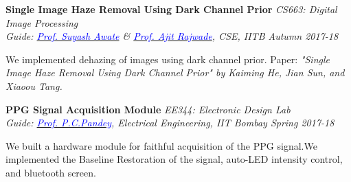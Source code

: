 \documentclass[margin,line, 9pt]{res}
\newenvironment{list1}{
  \begin{list}{\ding{113}}{%
      \setlength{\itemsep}{0in}
      \setlength{\parsep}{0in} \setlength{\parskip}{0in}
      \setlength{\topsep}{0in} \setlength{\partopsep}{0in} 
      \setlength{\leftmargin}{0.17in}}}{\end{list}}
\begin{document}
\begin{resume}
\begin{list1}
\end{list1}




{\bf Single Image Haze Removal Using Dark Channel Prior} \hfill \textit{CS663: Digital Image Processing} \\
{\em Guide: \href{https://www.cse.iitb.ac.in/~suyash}{\textcolor{blue}{Prof. Suyash Awate}} \& \href{https://www.cse.iitb.ac.in/~ajitvr}{\textcolor{blue}{Prof. Ajit Rajwade}}, CSE, IITB \hfill Autumn 2017-18} \\
\vspace*{-.15in}
\begin{list1}
\item[] We implemented dehazing of images using dark channel prior. Paper: \textit{"Single Image Haze Removal Using Dark Channel Prior" by Kaiming He, Jian Sun, and Xiaoou Tang.} 
\end{list1}


{\bf PPG Signal Acquisition Module} \hfill \textit{EE344: Electronic Design Lab} \\
{\em Guide: \href{https://www.ee.iitb.ac.in/~pcpandey/}{\textcolor{blue}{Prof. P.C.Pandey}}, Electrical Engineering, IIT Bombay \hfill Spring 2017-18} \\
\vspace*{-.15in}
\begin{list1}
\item[] We built a hardware module for faithful acquisition of the PPG signal.We implemented the Baseline Restoration of the signal, auto-LED intensity control, and bluetooth screen.
\end{list1}



\end{resume}
\end{document}
